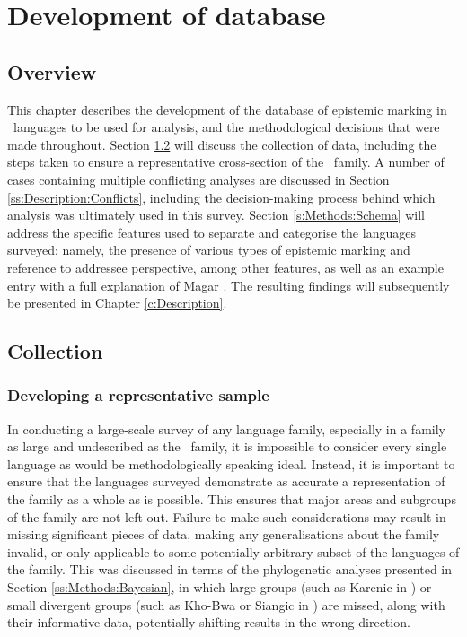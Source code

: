 \chapter{Development of database}\label{c:Methods}
\section{Overview}
This chapter describes the development of the database of epistemic marking in \lfam\ languages to be used for analysis, and the methodological decisions that were made throughout. Section \ref{s:Methods:Collection} will discuss the collection of data, including the steps taken to ensure a representative cross-section of the \lfam\ family. A number of cases containing multiple conflicting analyses are discussed in Section \ref{ss:Description:Conflicts}, including the decision-making process behind which analysis was ultimately used in this survey. Section \ref{s:Methods:Schema} will address the specific features used to separate and categorise the languages surveyed; namely, the presence of various types of epistemic marking and reference to addressee perspective, among other features, as well as an example entry with a full explanation of Magar \cite[Magaric: Nepal][]{GrunowHarsta2008}. The resulting findings will subsequently be presented in Chapter \ref{c:Description}.

\section{Collection}\label{s:Methods:Collection}
\subsection{Developing a representative sample}\label{ss:Methods:RepSample}
In conducting a large-scale survey of any language family, especially in a family as large and undescribed as the \lfam\ family, it is impossible to consider every single language as would be methodologically speaking ideal. Instead, it is important to ensure that the languages surveyed demonstrate as accurate a representation of the family as a whole as is possible. This ensures that major areas and subgroups of the family are not left out. Failure to make such considerations may result in missing significant pieces of data, making any generalisations about the family invalid, or only applicable to some potentially arbitrary subset of the languages of the family. This was discussed in terms of the phylogenetic analyses presented in Section \ref{ss:Methods:Bayesian}, in which large groups (such as Karenic in ) or small divergent groups (such as Kho-Bwa or Siangic in ) are missed, along with their informative data, potentially shifting results in the wrong direction.

